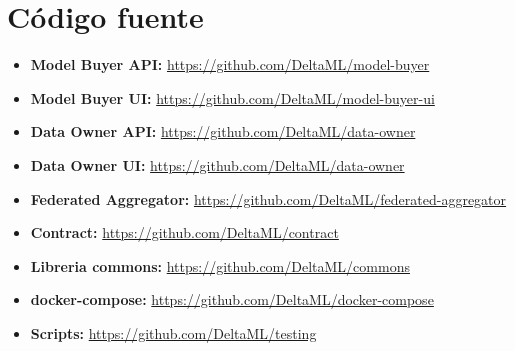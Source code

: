 \documentclass[
11pt, %
oneside, %
spanish, %
singlespacing, %
parskip, %
headsepline, %
chapterinoneline, %
]{MastersDoctoralThesis} %
\begin{document}

\chapter{Código fuente}

\begin{itemize}
\item \textbf{Model Buyer API:} \url{https://github.com/DeltaML/model-buyer}
\item \textbf{Model Buyer UI:} \url{https://github.com/DeltaML/model-buyer-ui}
\item \textbf{Data Owner API:} \url{https://github.com/DeltaML/data-owner}
\item \textbf{Data Owner UI:} \url{https://github.com/DeltaML/data-owner} 
\item \textbf{Federated Aggregator:} \url{https://github.com/DeltaML/federated-aggregator}
\item \textbf{Contract:} \url{https://github.com/DeltaML/contract}
\item \textbf{Libreria commons:} \url{https://github.com/DeltaML/commons}
\item \textbf{docker-compose:} \url{https://github.com/DeltaML/docker-compose}
\item \textbf{Scripts:} \url{https://github.com/DeltaML/testing}
\end{itemize}




\end{document}
